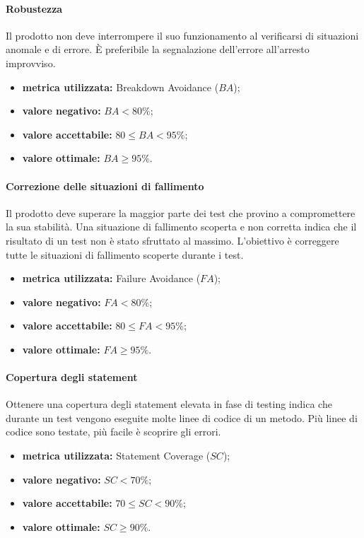		
		\paragraph{Robustezza}
			\label{OR}
			Il prodotto non deve interrompere il suo funzionamento al verificarsi di situazioni anomale e di errore. È preferibile la segnalazione dell'errore all'arresto improvviso.
			\begin{itemize}
				\item \textbf{metrica utilizzata:} Breakdown Avoidance ($BA$);
				\item \textbf{valore negativo:} $BA< 80\%$;
				\item \textbf{valore accettabile:} $80 \leq BA<95\%$;
				\item \textbf{valore ottimale:} $BA\geq 95\%$.
			\end{itemize}
		
		
		\paragraph{Correzione delle situazioni di fallimento}
			\label{OCDSDF}
			Il prodotto deve superare la maggior parte dei test che provino a compromettere la sua stabilità. Una situazione di fallimento scoperta e non corretta indica che il risultato di un test non è stato sfruttato al massimo. L'obiettivo è correggere tutte le situazioni di fallimento scoperte durante i test. 
				\begin{itemize}
					\item \textbf{metrica utilizzata:} Failure Avoidance ($FA$);
					\item \textbf{valore negativo:} $FA< 80\%$;
					\item \textbf{valore accettabile:} $80\leq FA<95\%$;
					\item \textbf{valore ottimale:} $FA\geq 95\%$.
				\end{itemize}
			
		\paragraph{Copertura degli statement}
			\label{OCDS}
			Ottenere una copertura degli statement elevata in fase di testing indica che durante un test vengono eseguite molte linee di codice di un metodo. Più linee di codice sono testate, più facile è scoprire gli errori.
			
			\begin{itemize}
				\item \textbf{metrica utilizzata:} Statement Coverage ($SC$);
				\item \textbf{valore negativo:} $SC< 70\%$;
				\item \textbf{valore accettabile:} $70\leq SC<90\%$;
				\item \textbf{valore ottimale:} $SC\geq 90\%$.
			\end{itemize}
		
